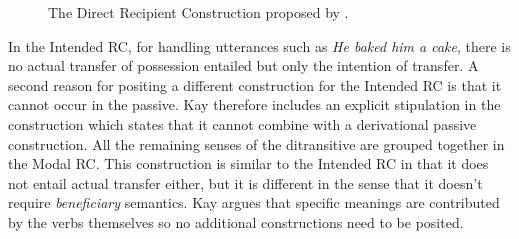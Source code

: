 \begin{figure}[t]
\caption{The Direct Recipient Construction proposed by \citet{kay05argument}.}
\label{f:drc}
\end{figure}

In the Intended RC, for handling utterances such as {\em He baked him a cake}, there is no actual transfer of possession entailed but only the intention of transfer. A second reason for positing a different construction for the Intended RC is that it cannot occur in the passive. Kay therefore includes an explicit stipulation in the construction which states that it cannot combine with a derivational passive construction. All the remaining senses of the ditransitive are grouped together in the Modal RC. This construction is similar to the Intended RC in that it does not entail actual transfer either, but it is different in the sense that it doesn't require {\em beneficiary} semantics. Kay argues that specific meanings are contributed by the verbs themselves so no additional constructions need to be posited. 

